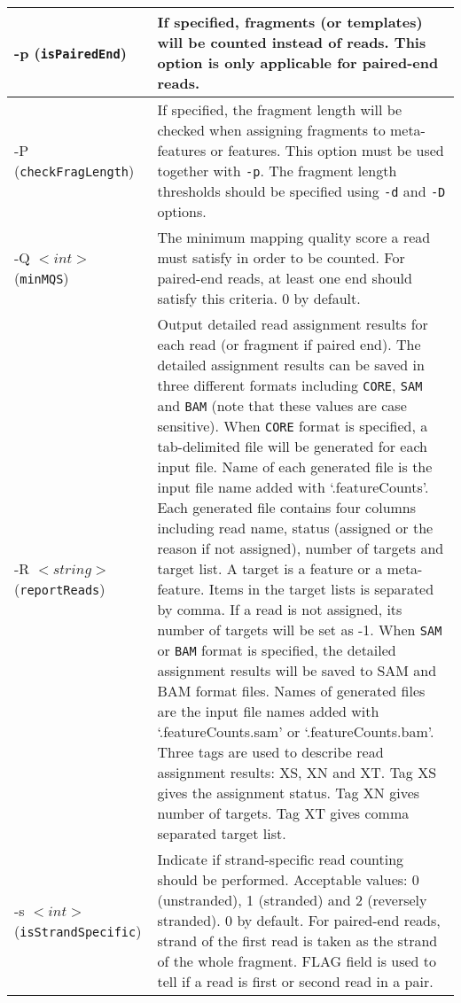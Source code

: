 \documentclass[12pt]{report}
\newcommand{\code}[1]{{\small\texttt{#1}}}
\begin{document}
\begin{longtable}{|p{5cm}|p{11cm}|}
\hline
-p \newline (\code{isPairedEnd}) & If specified, fragments (or templates) will be counted instead of reads. This option is only applicable for paired-end reads.\\
\hline
-P \newline (\code{checkFragLength}) & If specified, the fragment length will be checked when assigning fragments to meta-features or features. This option must be used together with \code{-p}. The fragment length thresholds should be specified using \code{-d} and \code{-D} options.\\
\hline
-Q $<int>$ \newline (\code{minMQS}) & The minimum mapping quality score a read must satisfy in order to be counted. For paired-end reads, at least one end should satisfy this criteria. 0 by default.\\
\hline
-R $<string>$ \newline (\code{reportReads}) & Output detailed read assignment results for each read (or fragment if paired end). The detailed assignment results can be saved in three different formats including \code{CORE}, \code{SAM} and \code{BAM} (note that these values are case sensitive). \newline When \code{CORE} format is specified, a tab-delimited file will be generated for each input file. Name of each generated file is the input file name added with `.featureCounts'.  Each generated file contains four columns including read name, status (assigned or the reason if not assigned), number of targets and target list. A target is a feature or a meta-feature. Items in the target lists is separated by comma. If a read is not assigned, its number of targets will be set as -1. \newline When \code{SAM} or \code{BAM} format is specified, the detailed assignment results will be saved to SAM and BAM format files. Names of generated files are the input file names added with `.featureCounts.sam' or `.featureCounts.bam'. Three tags are used to describe read assignment results: XS, XN and XT. Tag XS gives the assignment status. Tag XN gives number of targets. Tag XT gives comma separated target list. \\
\hline
-s $<int>$ \newline (\code{isStrandSpecific}) & Indicate if strand-specific read counting should be performed. Acceptable values:  0 (unstranded), 1 (stranded) and 2 (reversely stranded). 0 by default. For paired-end reads, strand of the first read is taken as the strand of the whole fragment. FLAG field is used to tell if a read is first or second read in a pair.\\

\end{longtable}
\end{document}
